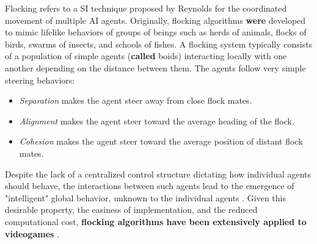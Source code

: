 \documentclass[journal]{IEEEtran}
\begin{document}
Flocking refers to a SI technique proposed by Reynolds \cite{Reynolds87} for the coordinated movement of multiple AI agents. Originally, flocking algorithms \textbf{were} developed to mimic lifelike behaviors of groups of beings such as herds of animals, flocks of birds, swarms of insects, and schools of fishes. A flocking system typically consists of a population of simple agents (\textbf{called} boids) interacting locally with one another depending on the distance between them. The agents follow very simple steering behaviors:

\begin{itemize}
	\item \textit{Separation} makes the agent steer away from close flock mates.
	\item \textit{Alignment} makes the agent steer toward the average heading of the flock.
	\item \textit{Cohesion} makes the agent steer toward the average position of distant flock mates.
\end{itemize} 

Despite the lack of a centralized control structure dictating how
individual agents should behave, the interactions between such agents
lead to the emergence of "intelligent" global behavior, unknown to the
individual agents \cite{SpectorEtAl03}. Given this desirable property,
the easiness of implementation, and the reduced computational cost,
\textbf{flocking algorithms have been extensively applied to videogames}
\cite{Scutt02}.
\end{document}
